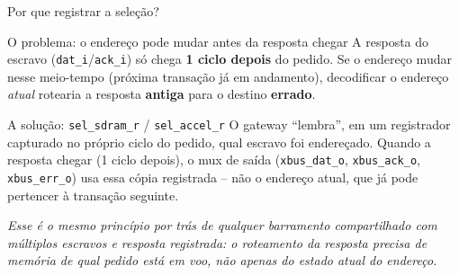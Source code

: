 \documentclass[aspectratio=169,10pt]{beamer}
\begin{document}
\begin{frame}{Por que registrar a seleção?}
  \begin{alertblock}{O problema: o endereço pode mudar antes da resposta chegar}
    A resposta do escravo (\texttt{dat\_i}/\texttt{ack\_i}) só chega \textbf{1 ciclo
    depois} do pedido. Se o endereço mudar nesse meio-tempo (próxima transação já
    em andamento), decodificar o endereço \textit{atual} rotearia a resposta
    \textbf{antiga} para o destino \textbf{errado}.
  \end{alertblock}
  \vspace{1em}
  \begin{block}{A solução: \texttt{sel\_sdram\_r} / \texttt{sel\_accel\_r}}
    O gateway ``lembra'', em um registrador capturado no próprio ciclo do
    pedido, qual escravo foi endereçado. Quando a resposta chegar (1 ciclo
    depois), o mux de saída (\texttt{xbus\_dat\_o}, \texttt{xbus\_ack\_o},
    \texttt{xbus\_err\_o}) usa essa cópia registrada -- não o endereço atual,
    que já pode pertencer à transação seguinte.
  \end{block}
  \vspace{1em}
  \small\textit{Esse é o mesmo princípio por trás de qualquer barramento
  compartilhado com múltiplos escravos e resposta registrada: o roteamento da
  resposta precisa de memória de \emph{qual pedido está em voo}, não apenas do
  estado atual do endereço.}
\end{frame}
\end{document}
